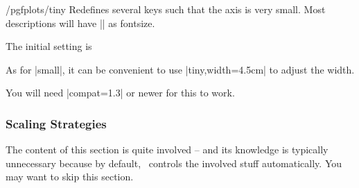 \begin{stylekey}{/pgfplots/tiny}
	Redefines several keys such that the axis is very small. Most descriptions will have |\tiny| as fontsize.

\begin{codeexample}[]
\end{codeexample}
	The initial setting is
\begin{codeexample}
\end{codeexample}
As for |small|, it can be convenient to use |tiny,width=4.5cm| to adjust the width.

You will need |compat=1.3| or newer for this to work.
\end{stylekey}


\subsubsection{Scaling Strategies}
	The content of this section is quite involved -- and its knowledge is typically unnecessary because by default, \PGFPlots\ controls the involved stuff automatically. You may want to skip this section.

